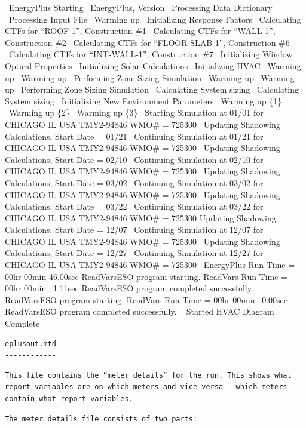 ~EnergyPlus Starting ~EnergyPlus, Version ~Processing Data Dictionary ~Processing Input File ~Warming up ~Initializing Response Factors ~Calculating CTFs for ``ROOF-1'', Construction \#1 ~Calculating CTFs for ``WALL-1'', Construction \#2 ~Calculating CTFs for ``FLOOR-SLAB-1'', Construction \#6 ~Calculating CTFs for ``INT-WALL-1'', Construction \#7 ~Initializing Window Optical Properties ~Initializing Solar Calculations ~Initializing HVAC ~Warming up ~Warming up ~Performing Zone Sizing Simulation ~Warming up ~Warming up ~Performing Zone Sizing Simulation ~Calculating System sizing ~Calculating System sizing ~Initializing New Environment Parameters ~Warming up \{1\} ~Warming up \{2\} ~Warming up \{3\} ~Starting Simulation at 01/01 for CHICAGO IL USA TMY2-94846 WMO\# = 725300 ~Updating Shadowing Calculations, Start Date = 01/21 ~Continuing Simulation at 01/21 for CHICAGO IL USA TMY2-94846 WMO\# = 725300 ~Updating Shadowing Calculations, Start Date = 02/10 ~Continuing Simulation at 02/10 for CHICAGO IL USA TMY2-94846 WMO\# = 725300 ~Updating Shadowing Calculations, Start Date = 03/02 ~Continuing Simulation at 03/02 for CHICAGO IL USA TMY2-94846 WMO\# = 725300 ~Updating Shadowing Calculations, Start Date = 03/22 ~Continuing Simulation at 03/22 for CHICAGO IL USA TMY2-94846 WMO\# = 725300 Updating Shadowing Calculations, Start Date = 12/07 ~Continuing Simulation at 12/07 for CHICAGO IL USA TMY2-94846 WMO\# = 725300 ~Updating Shadowing Calculations, Start Date = 12/27 ~Continuing Simulation at 12/27 for CHICAGO IL USA TMY2-94846 WMO\# = 725300 ~EnergyPlus Run Time = 00hr 00min 46.00sec ReadVarsESO program starting. ReadVars Run Time = 00hr 00min~ 1.11sec ReadVarsESO program completed successfully. ReadVarsESO program starting. ReadVars Run Time = 00hr 00min~ 0.00sec ReadVarsESO program completed successfully. ~ Started HVAC Diagram ~ Complete

\begin{lstlisting}
eplusout.mtd
------------
\end{lstlisting}

\begin{lstlisting}
This file contains the “meter details” for the run. This shows what report variables are on which meters and vice versa – which meters contain what report variables.
\end{lstlisting}

\begin{lstlisting}
The meter details file consists of two parts:
\end{lstlisting}

